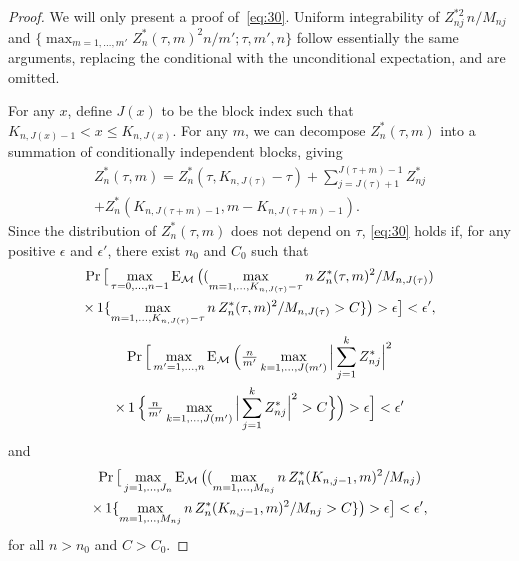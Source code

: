 \documentclass[11pt]{article}
\begin{document}
\begin{proof}
  We will only present a proof of~\eqref{eq:30}.  Uniform
  integrability of $Z^{*2}_{nj} \, n / M_{nj}$ and
  $\{\max_{m=1,\dots,m'} Z^{*}_n(\tau, m)^2 n / m'; \tau, m', n\}$
  follow essentially the same arguments, replacing the conditional
  with the unconditional expectation, and are omitted.

  For any $x$, define $J(x)$ to be the block index such that $K_{n,J(x) - 1} < x
  \leq K_{n,J(x)}$. For any $m$, we can decompose $Z_n^{*}(\tau, m)$
  into a summation of conditionally independent blocks, giving
  \begin{multline} \label{eq:42}
    Z^{*}_n(\tau, m) = Z_n^*(\tau, K_{n,J(\tau)} - \tau) +
    \sum_{j=J(\tau)+1}^{J(\tau + m)-1} Z_{nj}^* \\
    + Z_n^*(K_{n,J(\tau+m)-1}, m - K_{n,J(\tau + m)-1}).
  \end{multline}
  Since the distribution of $Z_n^*(\tau, m)$ does not depend on
  $\tau$, \eqref{eq:30} holds if, for any positive $\epsilon$ and
  $\epsilon'$, there exist $n_0$ and $C_0$ such that
  \begin{multline} \label{eq:31}
    \Pr \big [ \max_{\tau=0,\dots,n-1}
    \operatorname{E}_{\mathcal{M}} \big ( ( \max_{ m = 1, \dots, K_{n,J(\tau)} - \tau} n \, Z^*_n(\tau, m)^2 / M_{n,J(\tau)} ) \\
    \times \operatorname{1} \{ \max_{ m = 1, \dots, K_{n,J(\tau)} - \tau} n \, Z^*_n(\tau, m)^2 / M_{n,J(\tau)} > C \}
    \big ) > \epsilon \big ] < \epsilon',
  \end{multline}
  \begin{multline} \label{eq:44}
    \operatorname{Pr} \Big [
    \max_{m'=1,\dots,n}
    \operatorname{E}_{\mathcal{M}} \Big (
    \tfrac{n}{m'} \max_{k=1,\dots,J(m')} \Big\lvert \sum_{j=1}^{k} Z_{nj}^* \Big\rvert^2 \\
    \times \operatorname{1} \Big \{
    \tfrac{n}{m'} \max_{k=1,\dots,J(m')} \Big\lvert \sum_{j=1}^{k} Z_{nj}^* \Big\rvert^2
    > C \Big \} \Big ) > \epsilon \Big ] < \epsilon'
  \end{multline}
  and
  \begin{multline} \label{eq:5}
    \Pr \big [ \max_{j=1,\dots,J_n}
    \operatorname{E}_{\mathcal{M}} \big ( ( \max_{ m = 1, \dots, M_{nj}} n \, Z^*_n(K_{n,j-1}, m)^2 / M_{nj} ) \\
    \times \operatorname{1} \{ \max_{ m = 1, \dots, M_{nj}} n \, Z^*_n(K_{n,j-1}, m)^2 / M_{nj} > C \}
    \big ) > \epsilon \big ] < \epsilon',
  \end{multline}
  for all $n > n_0$ and $C > C_0$.


\end{proof}
\end{document}
